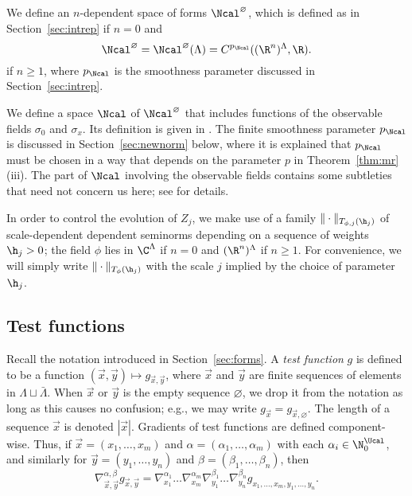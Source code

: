 We define an $n$-dependent space of forms
$\Ncal^\varnothing$, which is defined as in Section~\ref{sec:intrep} if $n = 0$ and
\begin{equation}
\label{e:Ncaldef}
\Ncal^\varnothing
	= \Ncal^\varnothing(\Lambda)
	= C^{p_\Ncal}((\R^n)^\Lambda,\R).
\end{equation}
if $n \ge 1$, where $p_\Ncal$ is the smoothness parameter discussed in Section~\ref{sec:intrep}.

We define a space $\Ncal$ of $\Ncal^\varnothing$ that includes functions
of the observable fields $\sigma_0$ and $\sigma_x$. Its definition is given
in \cite[Section~\ref{phi4-sec:phi4observables_representation}]{ST-phi4}.
The finite smoothness parameter $p_\Ncal$ is discussed in Section~\ref{sec:newnorm}
below, where it is explained that $p_\Ncal$ must be chosen in a way that depends on the
parameter $p$ in Theorem~\ref{thm:mr}(iii).
The part of $\Ncal$ involving the observable fields contains some subtleties that
need not concern us here; see \cite[Section~\ref{phi4-sec:phi4observables_representation}]{ST-phi4}
for details.

In order to control the evolution of $Z_j$, we make use of a family
$\|\cdot\|_{T_{\phi,j}(\h_j)}$ of scale-dependent dependent seminorms depending on a
sequence of weights $\h_j > 0$; the field $\phi$ lies in $\C^\Lambda$ if $n = 0$ and
$(\R^n)^\Lambda$ if $n \ge 1$. For convenience,
we will simply write $\|\cdot\|_{T_\phi(\h_j)}$ with the scale $j$ implied by the
choice of parameter $\h_j$.

\subsection{Test functions}

Recall the notation introduced in Section~\ref{sec:forms}.
A \emph{test function} $g$ is defined to be a function $(\vec x, \vec y) \mapsto g_{\vec x,\vec y}$,
where $\vec x$ and $\vec y$ are finite sequences of elements in $\Lambda \sqcup \bar\Lambda$.
When $\vec x$ or $\vec y$ is the empty sequence $\varnothing$,
we drop it from the notation as long as this causes no confusion;
e.g., we may write $g_{\vec x} = g_{\vec x,\varnothing}$.
The length of a sequence $\vec x$ is denoted $|\vec x|$.
Gradients of test functions are defined component-wise.
Thus, if $\vec x = (x_1, \ldots, x_m)$
and $\alpha = (\alpha_1, \ldots, \alpha_m)$
with each $\alpha_i \in \N_0^\Ucal$, and similarly for $\vec y=(y_1,\ldots,y_n)$ and
$\beta=(\beta_1,\ldots,\beta_n)$,
then
\begin{equation}
\nabla^{\alpha,\beta}_{\vec x,\vec y} g_{\vec x,\vec y}
  =
\nabla^{\alpha_1}_{x_1} \ldots \nabla^{\alpha_m}_{x_m}
\nabla^{\beta_1}_{y_1} \ldots \nabla^{\beta_n}_{y_n}  g_{x_1,\ldots,x_m,y_1,\ldots,y_n}.
\end{equation}

